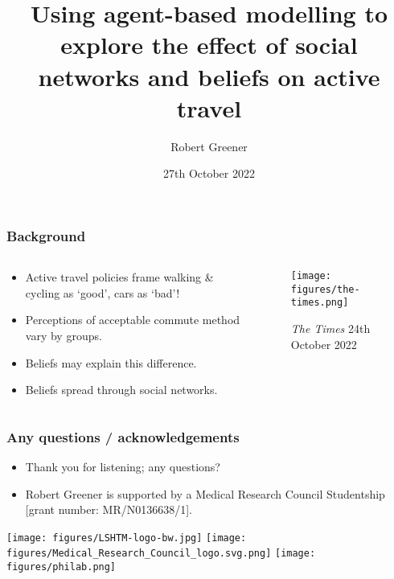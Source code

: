 \documentclass[aspectratio=169]{beamer}
\title{Using agent-based modelling to explore the effect of social networks and beliefs on active travel}
\author{Robert Greener}
\institute{London School of Hygiene and Tropical Medicine}
\date{27th October 2022}
\begin{document}
\maketitle

\begin{frame}
    \frametitle{Background}
    \begin{columns}
        \begin{column}{0.5\textwidth}
            \begin{itemize}
                \item Active travel policies frame walking \& cycling as `good', cars as `bad'!
                \item Perceptions of acceptable commute method vary by groups.
                \item Beliefs may explain this difference.
                \item Beliefs spread through social networks.
            \end{itemize}
        \end{column}
        \begin{column}{0.5\textwidth}
            \begin{figure}[H]
                \texttt{[image: figures/the-times.png]}
                \caption{\emph{The Times} 24th October 2022}
            \end{figure}
        \end{column}
    \end{columns}
\end{frame}

\begin{frame}
    \frametitle{Any questions / acknowledgements}
    \begin{itemize}
        \item Thank you for listening; any questions?
        \item Robert Greener is supported by a Medical Research Council Studentship [grant number: MR/N0136638/1].
    \end{itemize}
    \vspace*{4em}
    \texttt{[image: figures/LSHTM-logo-bw.jpg]}
    \texttt{[image: figures/Medical\_Research\_Council\_logo.svg.png]}
    \texttt{[image: figures/philab.png]}
\end{frame}
\end{document}
